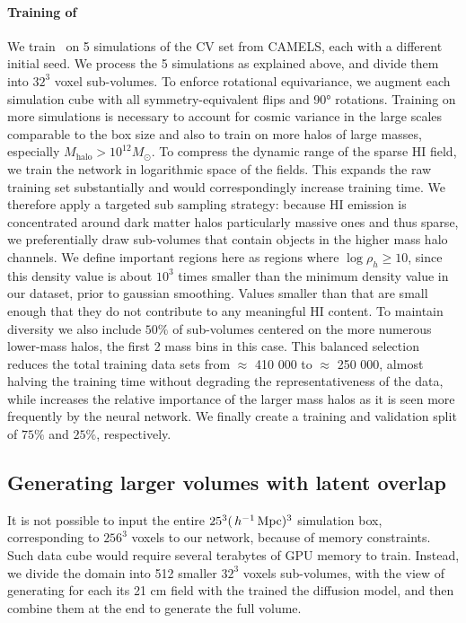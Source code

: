 \paragraph{Training of \LODI}


We train \LODI\ on 5 simulations of the CV set from CAMELS, each with a different initial seed. We process the 5 simulations as explained above, and divide them into $32^3$ voxel sub-volumes.
To enforce rotational equivariance, we augment each simulation cube with all symmetry-equivalent flips and 90° rotations. Training on more simulations is necessary to account for cosmic variance in the large scales comparable to the box size and also to train on more halos of large masses, especially $M_\text{halo}>10^{12}M_\odot$. To compress the dynamic range of the sparse HI field, we train the network in
logarithmic space of the fields. This expands the raw training set substantially and would correspondingly increase training time. We therefore apply a targeted sub sampling strategy: because HI emission is concentrated around dark matter halos particularly massive ones and thus sparse, we preferentially draw sub-volumes that contain objects in the higher mass halo channels. We define important regions here as regions where $\log \rho_h\geq 10$, since this density value is about $10^3$ times smaller than the minimum density value in our dataset, prior to gaussian smoothing. Values smaller than that are small enough that they do not contribute to any meaningful HI content. To maintain diversity we also include $50\%$ of sub-volumes centered on the more numerous lower-mass halos, the first 2 mass bins in this case. This balanced selection reduces the total training data sets from $\approx$ 410 000 to $\approx$ 250 000, almost halving the  training time without degrading the representativeness of the data, while increases the relative importance of the larger mass halos as it is seen more frequently by the neural network.  We finally create a training and validation split of $75\%$ and $25\%$, respectively.


\subsection{Generating larger volumes with latent overlap}

It is not possible to input the entire $25^3(\,h^{-1}\,\mathrm{Mpc})^3$ simulation box, corresponding to $256^3$ voxels to our network, because of memory constraints. Such data cube would require several terabytes of GPU memory to train. Instead, we divide the domain into 512 smaller $32^3$ voxels sub-volumes, with the view of generating for each its 21 cm field with the trained the diffusion model, and then combine them at the end to generate the full volume.

